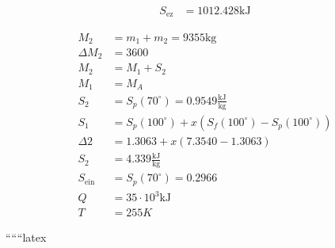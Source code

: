 \begin{align*}
    S_{\text{ez}} &= 1012.428 \text{kJ}
\end{align*}

\begin{align*}
    M_2 &= m_1 + m_2 = 9355 \text{kg} \\
    \Delta M_2 &= 3600 \\
    M_2 &= M_1 + S_2 \\
    M_1 &= M_A \\
    S_2 &= S_p(70^\circ) = 0.9549 \frac{\text{kJ}}{\text{kg}} \\
    S_1 &= S_p(100^\circ) + x \left( S_f(100^\circ) - S_p(100^\circ) \right) \\
    \Delta 2 &= 1.3063 + x \left( 7.3540 - 1.3063 \right) \\
    S_2 &= 4.339 \frac{\text{kJ}}{\text{kg}} \\
    S_{\text{ein}} &= S_p(70^\circ) = 0.2966 \\
    Q &= 35 \cdot 10^3 \text{kJ} \\
    T &= 255 K
\end{align*}

``````latex


